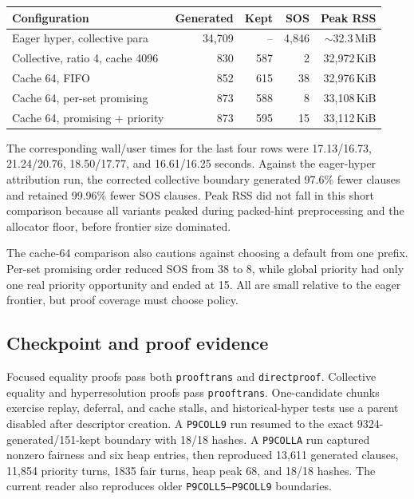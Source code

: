 \documentclass[11pt]{article}
\newcommand{\setting}[1]{\texttt{#1}}
\begin{document}
\begin{center}
\small
\begin{tabular}{lrrrr}
\toprule
Configuration & Generated & Kept & SOS & Peak RSS \\
\midrule
Eager hyper, collective para & 34,709 & -- & 4,846 & ${\sim}$32.3\,MiB \\
Collective, ratio 4, cache 4096 & 830 & 587 & 2 & 32,972\,KiB \\
Cache 64, FIFO & 852 & 615 & 38 & 32,976\,KiB \\
Cache 64, per-set promising & 873 & 588 & 8 & 33,108\,KiB \\
Cache 64, promising + priority & 873 & 595 & 15 & 33,112\,KiB \\
\bottomrule
\end{tabular}
\end{center}

The corresponding wall/user times for the last four rows were
17.13/16.73, 21.24/20.76, 18.50/17.77, and 16.61/16.25 seconds.  Against the
eager-hyper attribution run, the corrected collective boundary generated
97.6\% fewer clauses and retained 99.96\% fewer SOS clauses.  Peak RSS did not
fall in this short comparison because all variants peaked during packed-hint
preprocessing and the allocator floor, before frontier size dominated.

The cache-64 comparison also cautions against choosing a default from one
prefix.  Per-set promising order reduced SOS from 38 to 8, while global
priority had only one real priority opportunity and ended at 15.  All are
small relative to the eager frontier, but proof coverage must choose policy.

\subsection{Checkpoint and proof evidence}

Focused equality proofs pass both \setting{prooftrans} and
\setting{directproof}.  Collective equality and hyperresolution proofs pass
\setting{prooftrans}.  One-candidate chunks exercise replay, deferral, and
cache stalls, and historical-hyper tests use a parent disabled after descriptor
creation.  A \setting{P9COLL9} run resumed to the exact
9324-generated/151-kept boundary with 18/18 hashes.  A \setting{P9COLLA} run
captured nonzero fairness and six heap entries, then reproduced 13,611
generated clauses, 11,854 priority turns, 1835 fair turns, heap peak 68, and
18/18 hashes.  The current reader also reproduces older
\setting{P9COLL5--P9COLL9} boundaries.
\end{document}
